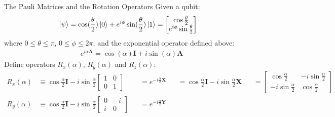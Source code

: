 \documentclass{beamer}
\begin{document}
\begin{frame}{The Pauli Matrices and the Rotation Operators\tiny\cite{rotationsonblochsphere}}
  {\tiny
    Given a qubit:
    \begin{align*}
      \ket{\psi} = \cos(\frac{\theta}2)\ket{0}+e^{i\phi}\sin(\frac{\theta}2)\ket{1} &= \begin{bmatrix}\cos{\frac{\theta}2} \\ e^{i\phi}\sin{\frac{\theta}2} \end{bmatrix}
    \end{align*}
    where $0\leqslant\theta\leqslant\pi$, $0\leqslant\phi\leqslant2\pi$, and the exponential operator defined above:
    \begin{align*}
      e^{i\alpha\mathbf{A}} = \cos(\alpha)\mathbf{I} + i\sin(\alpha)\mathbf{A}
    \end{align*}
    Define operators $R_x(\alpha)$, $R_y(\alpha)$ and $R_z(\alpha)$:
    \begin{align*}
      R_x(\alpha) &\equiv \cos\frac{\alpha}2\mathbf{I} - i\sin\frac{\alpha}2
                                                                     \begin{bmatrix}
                                                                       1 & 0 \\
                                                                       0 & 1
                                                                     \end{bmatrix}
                  &&= e^{-i\frac{\alpha}2\mathbf{X}}
                  &&= \cos\frac{\alpha}2\mathbf{I} - i\sin\frac{\alpha}2 \mathbf{X}
                  &&=\begin{bmatrix}
                    \cos\frac{\alpha}2 & -i\sin\frac{\alpha}2 \\
                    -i\sin\frac{\alpha}2 & \cos\frac{\alpha}2
                    \end{bmatrix} \\
      R_y(\alpha) &\equiv \cos\frac{\alpha}2\mathbf{I} - i\sin\frac{\alpha}2
                                                                     \begin{bmatrix}
                                                                       0 & -i \\
                                                                       i & 0
                                                                     \end{bmatrix}
                  &&= e^{-i\frac{\alpha}2\mathbf{Y}}

\end{align*}}
\end{frame}
\end{document}
